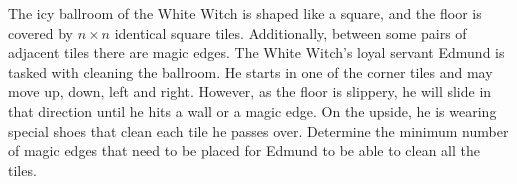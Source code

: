 The icy ballroom of the White Witch is shaped like a square,
and the floor is covered by $n \times n$ identical square tiles.
Additionally, between some pairs of adjacent tiles there are magic edges.
The White Witch's loyal servant Edmund is tasked with cleaning the ballroom.
He starts in one of the corner tiles and may move up, down, left and right.
However, as the floor is slippery, he will slide in that direction until he hits a wall or a magic edge.
On the upside, he is wearing special shoes that clean each tile he passes over. 
Determine the minimum number of magic edges that need to be placed for Edmund to be able to clean all the tiles.
